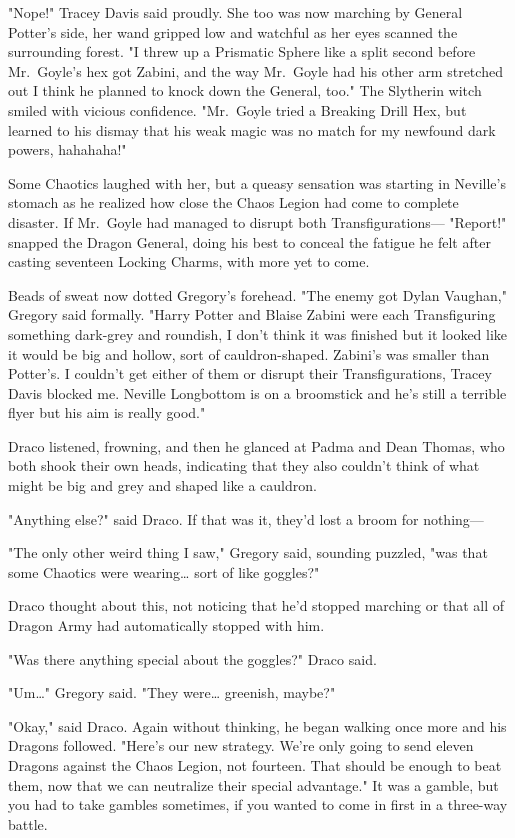 "Nope!" Tracey Davis said proudly. She too was now marching by General Potter's 
side, her wand gripped low and watchful as her eyes scanned the surrounding 
forest. "I threw up a Prismatic Sphere like a split second before Mr.~Goyle's 
hex got Zabini, and the way Mr.~Goyle had his other arm stretched out I think 
he planned to knock down the General, too." The Slytherin witch smiled with 
vicious confidence. "Mr.~Goyle tried a Breaking Drill Hex, but learned to his 
dismay that his weak magic was no match for my newfound dark powers, hahahaha!"

Some Chaotics laughed with her, but a queasy sensation was starting in 
Neville's stomach as he realized how close the Chaos Legion had come to 
complete disaster. If Mr.~Goyle had managed to disrupt both Transfigurations---
\sbreak
"Report!" snapped the Dragon General, doing his best to conceal the fatigue he 
felt after casting seventeen Locking Charms, with more yet to come.

Beads of sweat now dotted Gregory's forehead. "The enemy got Dylan Vaughan," 
Gregory said formally. "Harry Potter and Blaise Zabini were each Transfiguring 
something dark-grey and roundish, I don't think it was finished but it looked 
like it would be big and hollow, sort of cauldron-shaped. Zabini's was smaller 
than Potter's. I couldn't get either of them or disrupt their Transfigurations, 
Tracey Davis blocked me. Neville Longbottom is on a broomstick and he's still a 
terrible flyer but his aim is really good."

Draco listened, frowning, and then he glanced at Padma and Dean Thomas, who 
both shook their own heads, indicating that they also couldn't think of what 
might be big and grey and shaped like a cauldron.

"Anything else?" said Draco. If that was it, they'd lost a broom for nothing---

"The only other weird thing I saw," Gregory said, sounding puzzled, "was that 
some Chaotics were wearing{\ldots} sort of like goggles?"

Draco thought about this, not noticing that he'd stopped marching or that all 
of Dragon Army had automatically stopped with him.

"Was there anything special about the goggles?" Draco said.

"Um{\ldots}" Gregory said. "They were{\ldots} greenish, maybe?"

"Okay," said Draco. Again without thinking, he began walking once more and his 
Dragons followed. "Here's our new strategy. We're only going to send eleven 
Dragons against the Chaos Legion, not fourteen. That should be enough to beat 
them, now that we can neutralize their special advantage." It was a gamble, but 
you had to take gambles sometimes, if you wanted to come in first in a 
three-way battle.

